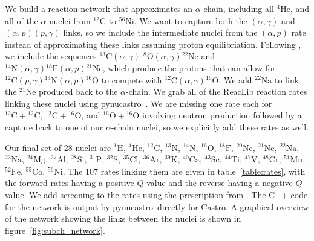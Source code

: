 \documentclass{aastex63}
\newcommand{\castro}{{\sf Castro}}
\newcommand{\pynucastro}{{\sf pynucastro}}
\newcommand{\isotm}[2]{{}^{#2}\mathrm{#1}}
\begin{document}
We build a reaction network that approximates an $\alpha$-chain,
including all $\isotm{He}{4}$, and all of the $\alpha$ nuclei from
$\isotm{C}{12}$ to $\isotm{Ni}{56}$.  We want to capture both the
$(\alpha,\gamma)$ and $(\alpha,p)(p,\gamma)$ links, so we include the
intermediate nuclei from the $(\alpha,p)$ rate instead of
approximating these links assuming proton equilibriation.  
Following \citet{shenbildsten}, we include the sequences
$\isotm{C}{13}(\alpha,\gamma)\isotm{O}{18}(\alpha,\gamma)\isotm{Ne}{22}$
and $\isotm{N}{14}(\alpha,\gamma)\isotm{F}{18}(\alpha,
p)\isotm{Ne}{21}$, which produce the protons that can allow for
$\isotm{C}{12}(p, \gamma)\isotm{N}{13}(\alpha, p)\isotm{O}{16}$ to compete
with $\isotm{C}{12}(\alpha,\gamma)\isotm{O}{16}$.  We add $\isotm{Na}{22}$
to link the $\isotm{Ne}{21}$ produced back to the $\alpha$-chain.  We grab
all of the ReacLib \citep{reaclib} reaction rates linking these nuclei using \pynucastro~\citep{pynucastro}.
We are missing one rate each for $\isotm{C}{12} + \isotm{C}{12}$,
$\isotm{C}{12} + \isotm{O}{16}$, and $\isotm{O}{16} + \isotm{O}{16}$
    involving neutron production followed by a capture back to one of
    our $\alpha$-chain nuclei, so we explicitly add these rates as
    well.

Our final set of 28 nuclei are ${}^{1}\mathrm{H}$, ${}^{4}\mathrm{He}$, ${}^{12}\mathrm{C}$, ${}^{13}\mathrm{N}$, ${}^{14}\mathrm{N}$, ${}^{16}\mathrm{O}$, ${}^{18}\mathrm{F}$, ${}^{20}\mathrm{Ne}$, ${}^{21}\mathrm{Ne}$, ${}^{22}\mathrm{Na}$, ${}^{23}\mathrm{Na}$, ${}^{24}\mathrm{Mg}$, ${}^{27}\mathrm{Al}$, ${}^{28}\mathrm{Si}$, ${}^{31}\mathrm{P}$, ${}^{32}\mathrm{S}$, ${}^{35}\mathrm{Cl}$, ${}^{36}\mathrm{Ar}$, ${}^{39}\mathrm{K}$, ${}^{40}\mathrm{Ca}$, ${}^{43}\mathrm{Sc}$, ${}^{44}\mathrm{Ti}$, ${}^{47}\mathrm{V}$, ${}^{48}\mathrm{Cr}$, ${}^{51}\mathrm{Mn}$, ${}^{52}\mathrm{Fe}$, ${}^{55}\mathrm{Co}$, ${}^{56}\mathrm{Ni}$.  The 107
rates linking them are given in table~\ref{table:rates}, with the
forward rates having a positive $Q$ value and the reverse having a
negative $Q$ value.  We add screening to the rates using the prescription
from \citet{graboske:1973,alastuey:1978,itoh:1979}.  The C++ code for the network is output by \pynucastro\
directly for \castro.  A graphical overview of the network showing the links
between the nuclei is shown in figure~\ref{fig:subch_network}.
\end{document}
